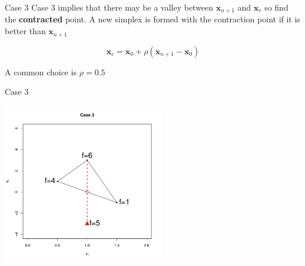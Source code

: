 \documentclass[10pt]{beamer}
\begin{document}
                                                                                              \begin{frame}{Case 3}
                                                                                                Case 3 implies that there may be a valley between ${\bm x_{n+1}}$ and ${\bm x_{r}}$ so find the {\bf contracted} point.  A new simplex is formed with the contraction point if it is better than ${\bm x_{n+1}}$

                                                                                                \begin{equation}
                                                                                                  {\bm x_c}={\bm x_0}+\rho({\bm x_{n+1}}-{\bm x_0})
                                                                                                \end{equation}

                                                                                                A common choice is $\rho=0.5$
                                                                                              \end{frame}
                                                                                              \begin{frame}{Case 3}
                                                                                                \begin{center}
                                                                                                  \includegraphics[height=7cm]{RCode/nmcontraction1.pdf}
                                                                                                \end{center}
                                                                                              \end{frame}
\end{document}
